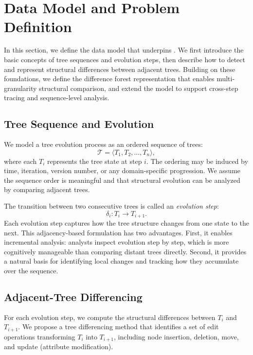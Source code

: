 \section{Data Model and Problem Definition}
\label{sec:data_model}

In this section, we define the data model that underpins \sysname{}. We first introduce the basic concepts of tree sequences and evolution steps, then describe how to detect and represent structural differences between adjacent trees. Building on these foundations, we define the difference forest representation that enables multi-granularity structural comparison, and extend the model to support cross-step tracing and sequence-level analysis.

\subsection{Tree Sequence and Evolution}
\label{sec:tree_sequence}

We model a tree evolution process as an ordered sequence of trees:
\[
\mathcal{T} = \langle T_1, T_2, \dots, T_n \rangle,
\]
where each $T_i$ represents the tree state at step $i$. The ordering may be induced by time, iteration, version number, or any domain-specific progression. We assume the sequence order is meaningful and that structural evolution can be analyzed by comparing adjacent trees.

The transition between two consecutive trees is called an \emph{evolution step}:
\[
\delta_i : T_i \rightarrow T_{i+1}.
\]
Each evolution step captures how the tree structure changes from one state to the next. This adjacency-based formulation has two advantages. First, it enables incremental analysis: analysts inspect evolution step by step, which is more cognitively manageable than comparing distant trees directly. Second, it provides a natural basis for identifying local changes and tracking how they accumulate over the sequence.

\subsection{Adjacent-Tree Differencing}
\label{sec:differencing}

For each evolution step, we compute the structural differences between $T_i$ and $T_{i+1}$. We propose a tree differencing method that identifies a set of edit operations transforming $T_i$ into $T_{i+1}$, including node insertion, deletion, move, and update (attribute modification). 

